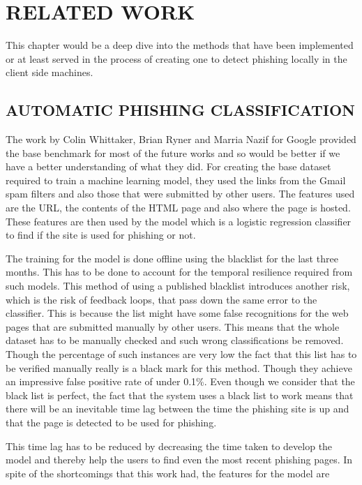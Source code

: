 \chapter{RELATED WORK} %
This chapter would be a deep dive into the methods that have been implemented or at least served in the process of creating one to detect phishing locally in the client side machines.

\section{AUTOMATIC PHISHING CLASSIFICATION}
The work by Colin Whittaker, Brian Ryner and Marria Nazif for Google provided the base benchmark for most of the future works and so would be better if we have a better understanding of what they did. For creating the base dataset required to train a machine learning model, they used the links from the Gmail spam filters and also those that were submitted by other users. The features used are the URL, the contents of the HTML page and also where the page is hosted. These features are then used by the model which is a logistic regression classifier to find if the site is used for phishing or not.

The training for the model is done offline using the blacklist for the last three months. This has to be done to account for the temporal resilience required from such models. This method of using a published blacklist introduces another risk, which is the risk of feedback loops, that pass down the same error to the classifier. This is because the list might have some false recognitions for the web pages that are submitted manually by other users. This means that the whole dataset has to be manually checked and such wrong classifications be removed. Though the percentage of such instances are very low the fact that this list has to be verified manually really is a black mark for this method. Though they achieve an impressive false positive rate of under 0.1\%. Even though we consider that the black list is perfect, the fact that the system uses a black list to work means that there will be an inevitable time lag between the time the phishing site is up and that the page is detected to be used for phishing.

This time lag has to be reduced by decreasing the time taken to develop the model and thereby help the users to find even the most recent phishing pages. In spite of the shortcomings that this work had, the features for the model are

